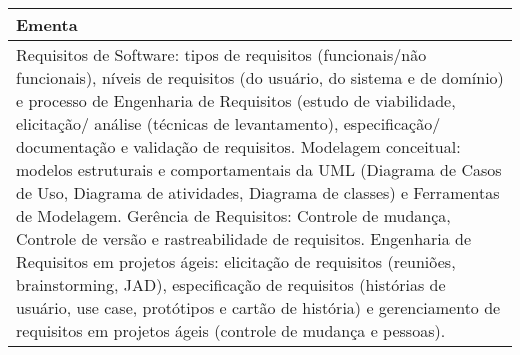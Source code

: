 \begin{quadro}[ht!]
\begin{tabular}{|p{3cm} p{2cm} p{3cm} p{2cm} p{3cm} p{2cm}|}
\multicolumn{6}{|p{15cm}|}{\cellcolor{blue1} Ementa} \\\hline
\hline\multicolumn{6}{|p{15cm}|}{\scriptsize Requisitos de Software: tipos de requisitos (funcionais/não funcionais), níveis de requisitos (do usuário, do sistema e de domínio) e processo de Engenharia de Requisitos (estudo de viabilidade, elicitação/ análise (técnicas de levantamento), especificação/ documentação e validação de requisitos. Modelagem conceitual: modelos estruturais e comportamentais da UML (Diagrama de Casos de Uso, Diagrama de atividades, Diagrama de classes) e Ferramentas de Modelagem. Gerência de Requisitos: Controle de mudança, Controle de versão e rastreabilidade de requisitos. Engenharia de Requisitos em projetos ágeis: elicitação de requisitos (reuniões, brainstorming, JAD), especificação de requisitos (histórias de usuário, use case, protótipos e cartão de história) e gerenciamento de requisitos em projetos ágeis (controle de mudança e pessoas).}\\\hline 
\hline
	\end{tabular}
\end{quadro}


